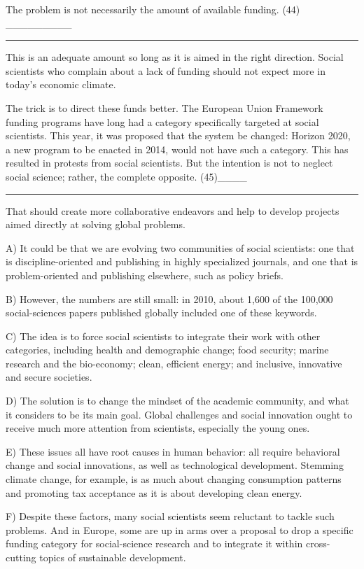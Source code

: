 \documentclass[UTF8,11pt]{ctexart}
\begin{document}
The problem is not necessarily the amount of available funding. (44) \_\_\_\_\_\_\_\_\_ \par\noindent\rule{.95\linewidth}{.4pt}\par  This is an adequate amount so long as it is aimed in the right direction. Social scientists who complain about a lack of funding should not expect more in today’s economic climate.


The trick is to direct these funds better. The European Union Framework funding programs have long had a category specifically targeted at social scientists. This year, it was proposed that the system be changed: Horizon 2020, a new program to be enacted in 2014, would not have such a category. This has resulted in protests from social scientists. But the intention is not to neglect social science; rather, the complete opposite. (45)\_\_\_\_ \par\noindent\rule{.95\linewidth}{.4pt}\par  That should create more collaborative endeavors and help to develop projects aimed directly at solving global problems.


A) It could be that we are evolving two communities of social scientists: one that is discipline-oriented and publishing in highly specialized journals, and one that is problem-oriented and publishing elsewhere, such as policy briefs.


B) However, the numbers are still small: in 2010, about 1,600 of the 100,000 social-sciences papers published globally included one of these keywords.


C) The idea is to force social scientists to integrate their work with other categories, including health and demographic change; food security; marine research and the bio-economy; clean, efficient energy; and inclusive, innovative and secure societies.


D) The solution is to change the mindset of the academic community, and what it considers to be its main goal. Global challenges and social innovation ought to receive much more attention from scientists, especially the young ones.


E) These issues all have root causes in human behavior: all require behavioral change and social innovations, as well as technological development. Stemming climate change, for example, is as much about changing consumption patterns and promoting tax acceptance as it is about developing clean energy.


F) Despite these factors, many social scientists seem reluctant to tackle such problems. And in Europe, some are up in arms over a proposal to drop a specific funding category for social-science research and to integrate it within cross-cutting topics of sustainable development.
\end{document}
